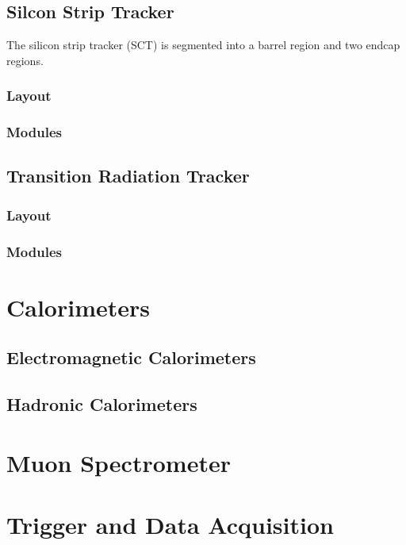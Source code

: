 \subsection{Silcon Strip Tracker}

The silicon strip tracker (SCT) is segmented into a barrel region and
two endcap regions. 

\subsubsection{Layout}

\subsubsection{Modules}

\subsection{Transition Radiation Tracker}

\subsubsection{Layout}
\subsubsection{Modules}

\section{Calorimeters}
\subsection{Electromagnetic Calorimeters}
\subsection{Hadronic Calorimeters}
\section{Muon Spectrometer}
\section{Trigger and Data Acquisition}
